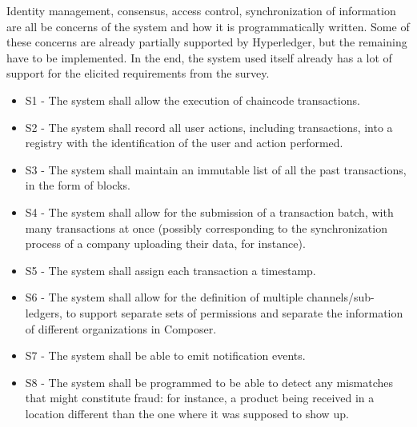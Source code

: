 		Identity management, consensus, access control, synchronization of information are all be concerns of the system and how it is programmatically written. Some of these concerns are already partially supported by Hyperledger, but the remaining have to be implemented. In the end, the system used itself already has a lot of support for the elicited requirements from the survey.
		\begin{itemize}
			\item S1 - The system shall allow the execution of chaincode transactions.
			\item S2 - The system shall record all user actions, including transactions, into a registry with the identification of the user and action performed. %
			\item S3 - The system shall maintain an immutable list of all the past transactions, in the form of blocks.
			\item S4 - The system shall allow for the submission of a transaction batch, with many transactions at once (possibly corresponding to the synchronization process of a company uploading their data, for instance).
			\item S5 - The system shall assign each transaction a timestamp.
			\item S6 - The system shall allow for the definition of multiple channels/sub-ledgers, to support separate sets of permissions and separate the information of different organizations in Composer.%
			\item S7 - The system shall be able to emit notification events.
			\item S8 - The system shall be programmed to be able to detect any mismatches that might constitute fraud: for instance, a product being received in a location different than the one where it was supposed to show up.

\end{itemize}
